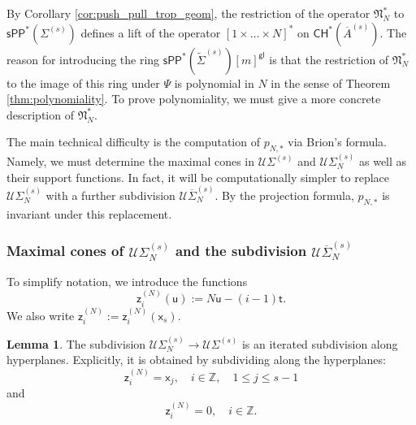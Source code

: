 \documentclass[11pt]{article}
\def\CH{\mathsf{CH}}
\newcommand{\barA}{\overline{A}}
\newcommand{\sPP}{\mathsf{sPP}}
\newcommand{\spp}{\sPP}
\theoremstyle{definition}
\newtheorem{lemma}[definition]{Lemma}
\begin{document}
By Corollary \ref{cor:push_pull_trop_geom}, the restriction of the operator $\mathfrak{N}_N^{\ast}$ to
$\spp^{\ast}(\Sigma^{(s)})$ defines a lift of the operator $[1\times\dots\times N]^{\ast}$
on $\CH^{\ast}(\barA^{(s)})$. The reason for introducing the ring $\spp^{\ast}(\tilde{\Sigma}^{(s)})[m]^{\mathsf{gl}}$ is that the restriction of $\mathfrak{N}_N^{\ast}$
to the image of this ring under $\Psi$ is polynomial in $N$ in the sense of Theorem \ref{thm:polynomiality}. To prove
polynomiality, we must give a more concrete description of $\mathfrak{N}_N^{\ast}$.

The main
technical difficulty is the computation of $p_{N,\ast}$ via Brion's formula. Namely, we must determine
the maximal cones in $\mathcal U\Sigma^{(s)}$ and $\mathcal U\Sigma_N^{(s)}$ as well as their support functions. In fact, it
will be computationally simpler to replace $\mathcal U\Sigma_N^{(s)}$ with a further subdivision $\mathcal U\overline{\Sigma}_N^{(s)}$.
By the projection formula, $p_{N,\ast}$ is invariant under this replacement.

\subsubsection{Maximal cones of $\mathcal U\Sigma_N^{(s)}$ and the subdivision $\mathcal U\overline{\Sigma}_N^{(s)}$}

To simplify notation, we introduce the functions
$$\mathsf{z}_i^{(N)}(\mathsf{u}):=N\mathsf{u}-(i-1)\mathsf{t}.$$
We also write $\mathsf{z}_i^{(N)}:=\mathsf{z}_i^{(N)}(\mathsf{x}_s)$.

\begin{lemma}
	\label{lem:explicit-N-refinement}
	The subdivision $\mathcal U\Sigma_N^{(s)}\to \mathcal U\Sigma^{(s)}$
	is an iterated subdivision along hyperplanes. Explicitly, it is obtained by subdividing
	along the hyperplanes:
	$$\mathsf{z}_{i}^{(N)}=\mathsf{x}_j,\quad i\in \mathbb{Z},\quad 1\le j\le s-1$$
	and
	$$\mathsf{z}_{i}^{(N)}=0,\quad i\in \mathbb{Z}.$$
\end{lemma}
\end{document}
